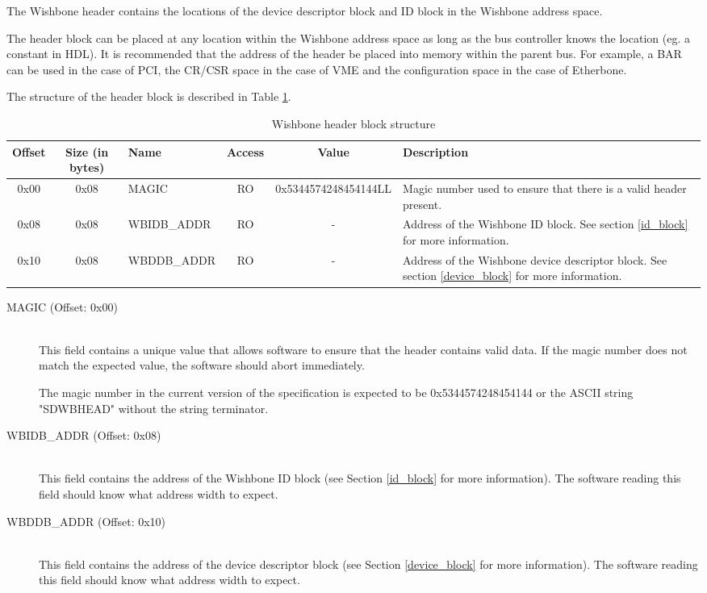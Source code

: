 \documentclass{article}
\begin{document}
The Wishbone header contains the locations of the device descriptor block and 
ID block in the Wishbone address space.

The header block can be placed at any location within the Wishbone address space
as long as the bus controller knows the location (eg. a constant in HDL).
It is recommended that the address of the header be placed into memory
within the parent bus. For example, a BAR can be used in the case of PCI,
the CR/CSR space in the case of VME and the configuration space in the case
of Etherbone.

The structure of the header block is described in Table \ref{hdr_block_struct}.

\begin{center}
	\begin{savenotes}
	\begin{table}[!ht]\footnotesize
	\caption{Wishbone header block structure}\label{hdr_block_struct}\centering
	\begin{tabular}{| c | c | l | c | c | p{5cm} |} \hline
	Offset & Size (in bytes) & Name & Access & Value & Description \\ \hline
	0x00 & 0x08 & MAGIC & RO & 0x5344574248454144LL & Magic number used to ensure that there is a valid header present. \\ \hline
	0x08 & 0x08 & WBIDB\_ADDR & RO & - & Address of the Wishbone ID block. See section \ref{id_block} for more information. \\ \hline
	0x10 & 0x08 & WBDDB\_ADDR & RO & - & Address of the Wishbone device descriptor block. See section \ref{device_block} for more information. \\ \hline
	\end{tabular}
	\end{table}
	\end{savenotes}
\end{center}

\begin{description}
\item[MAGIC (Offset: 0x00)] \hfill \\
This field contains a unique value that allows software to ensure that
the header contains valid data. If the magic number does not match the
expected value, the software should abort immediately.

The magic number in the current version of the specification is expected to
be 0x5344574248454144 or the ASCII string "SDWBHEAD" without the string
terminator.

\item[WBIDB\_ADDR (Offset: 0x08)] \hfill \\
This field contains the address of the Wishbone ID block (see Section \ref{id_block}
for more information). The software reading this field should know what address width
to expect.

\item[WBDDB\_ADDR (Offset: 0x10)] \hfill \\
This field contains the address of the device descriptor block (see Section
\ref{device_block} for more information). The software reading this field should
know what address width to expect.
\end{description}
\end{document}
